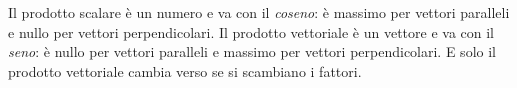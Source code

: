 \begin{attenzione}
Il prodotto scalare è un numero e va con il \emph{coseno}: è massimo per vettori paralleli e nullo per vettori perpendicolari. Il prodotto vettoriale è un vettore e va con il \emph{seno}: è nullo per vettori paralleli e massimo per vettori perpendicolari. E solo il prodotto vettoriale cambia verso se si scambiano i fattori.
\end{attenzione}



\riepilogoformule
